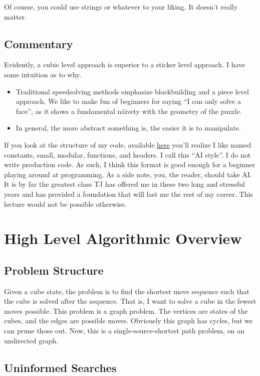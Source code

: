 \documentclass[11pt, oneside]{article}
\begin{document}
Of course, you could use strings or whatever
to your liking. It doesn't really matter.

\subsection{Commentary}
Evidently, a cubie level approach is superior to a
sticker level approach. I have some intuition as to why.
\begin{itemize}
  \item Traditional speedsolving methods emphasize blockbuilding and a
    piece level approach. We like to make fun of beginners for saying ``I
    can only solve a face'', as it shows a fundamental näivety with the
    geometry of the puzzle.
  \item In general, the more abstract something
    is, the easier it is to manipulate.
\end{itemize}

If you look at the structure of my code, available
\href{https://github.com/stephen-huan/Cube-Solver}{here} you'll realize I like
named constants, small, modular, functions, and headers. I call this ``AI
style''. I do not write production code. As such, I think this format is good
enough for a beginner playing around at programming. As a side note, you, the
reader, should take AI. It is by far the greatest class TJ has offered me in
these two long and stressful years and has provided a foundation that will last
me the rest of my career. This lecture would not be possible otherwise.

\section{High Level Algorithmic Overview}

\subsection{Problem Structure}
Given a cube state, the problem is to find the shortest move sequence such
that the cube is solved after the sequence. That is, I want to solve a cube in
the fewest moves possible. This problem is a graph problem. The vertices are
states of the cubes, and the edges are possible moves. Obviously this graph
has cycles, but we can prune those out. Now, this is a single-source-shortest
path problem, on an undirected graph.

\subsection{Uninformed Searches}
\end{document}
